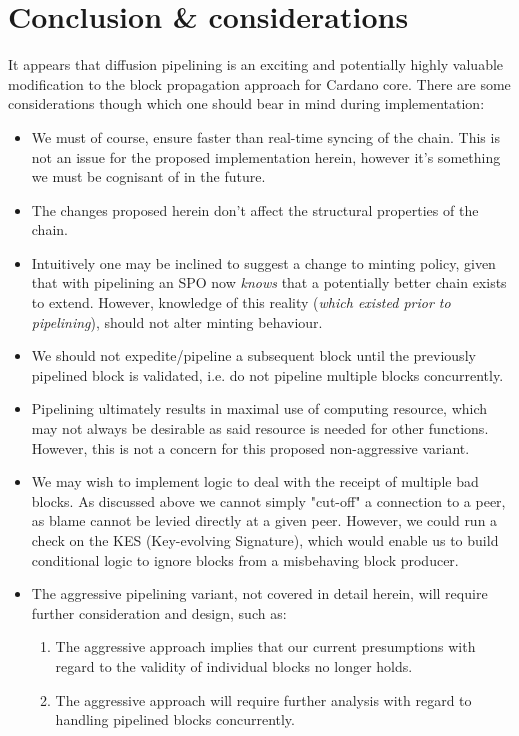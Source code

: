 \documentclass[11pt,a4paper]{article}
\begin{document}
\pagebreak
  
\section{Conclusion \& considerations}
\label{conclusion-and-considerations}
It appears that diffusion pipelining is an exciting and potentially highly valuable 
modification to the block propagation approach for Cardano core. There are some considerations
though which one should bear in mind during implementation:

\begin{itemize}
  \item We must of course, ensure faster than real-time syncing of the chain. This is not an issue for the proposed implementation herein, however it's something we must be cognisant of in the future.
  \item The changes proposed herein don’t affect the structural properties of the chain.
  \item Intuitively one may be inclined to suggest a change to minting policy, given that with pipelining an SPO now \emph{knows} that a potentially better chain exists to extend. However, knowledge of this reality (\emph{which existed prior to pipelining}), should not alter minting behaviour. 
  \item We should not expedite/pipeline a subsequent block until the previously pipelined block is validated, i.e. do not pipeline multiple blocks concurrently.
  \item Pipelining ultimately results in maximal use of computing resource, which may not always be desirable as said resource is needed for other functions. However, this is not a concern for this proposed non-aggressive variant.
  \item We may wish to implement logic to deal with the receipt of multiple bad blocks. As discussed above we cannot simply "cut-off" a connection to a peer, as blame cannot be levied directly at a given peer. However, we could run a check on the KES (Key-evolving Signature), which would enable us to build conditional logic to ignore blocks from a misbehaving block producer.
  \item The aggressive pipelining variant, not covered in detail herein, will require further consideration and design, such as:
  \begin{enumerate}
    \item The aggressive approach implies that our current presumptions with regard to the validity of individual blocks no longer holds.
    \item The aggressive approach will require further analysis with regard to handling pipelined blocks concurrently. 
  \end{enumerate}
\end{itemize}
\end{document}
